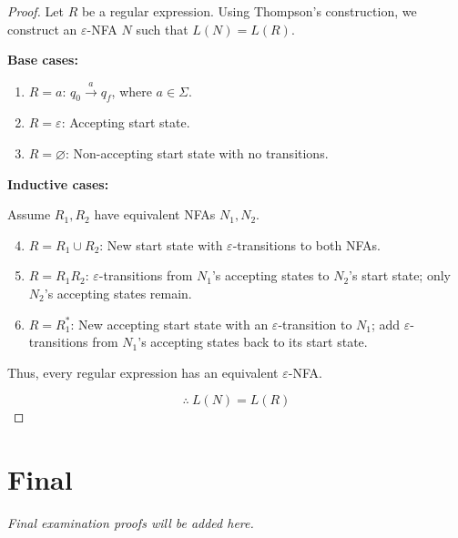 \documentclass[11pt]{scrreprt}
\begin{document}
\begin{proof}
    Let $R$ be a regular expression. Using Thompson's
    construction, we construct an $\varepsilon$-NFA $N$
    such that $L(N) = L(R)$.

    \medskip
    \noindent\textbf{Base cases:}

    \begin{enumerate}
        \item $R = a$:
        $q_0 \xrightarrow{a} q_f$, where $a \in \Sigma$.

        \item $R = \varepsilon$:
        Accepting start state.

        \item $R = \varnothing$:
        Non-accepting start state with no transitions.
    \end{enumerate}

    \medskip
    \noindent\textbf{Inductive cases:}

    Assume $R_1, R_2$ have equivalent NFAs $N_1, N_2$.

    \begin{enumerate}
        \setcounter{enumi}{3}

        \item $R = R_1 \cup R_2$:
        New start state with $\varepsilon$-transitions
        to both NFAs.

        \item $R = R_1 R_2$:
        $\varepsilon$-transitions from $N_1$'s accepting
        states to $N_2$'s start state; only $N_2$'s
        accepting states remain.

        \item $R = R_1^*$:
        New accepting start state with an
        $\varepsilon$-transition to $N_1$; add
        $\varepsilon$-transitions from $N_1$'s
        accepting states back to its start state.
    \end{enumerate}

    Thus, every regular expression has an equivalent
    $\varepsilon$-NFA.

    \[
        \boxed{\therefore\ L(N) = L(R)}
    \]
\end{proof}

\chapter{Final}

\noindent\emph{Final examination proofs will be added here.}
\end{document}
